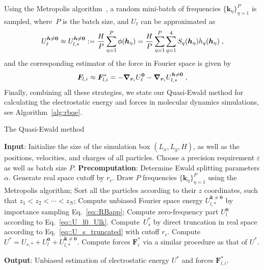 Using the Metropolis algorithm~\cite{metropolis1953equation}, a random mini-batch of frequencies $\{\bm{k}_{\eta}\}_{\eta=1}^P$ is sampled, where~$P$ is the batch size, and $U_\ell$ can be approximated as 
\begin{equation}\label{eq::RBapp}
 U_\ell^{\boldsymbol{h}\neq \bm{0}} \approx U_{l,\ast}^{\boldsymbol{h}\neq \bm{0}}  :=   \frac{H}{P}\sum_{\eta=1}^P \phi(\boldsymbol{h}_{\eta})=  \frac{H}{P}\sum_{\eta=1}^P \sum_{q=1}^4S_q(\boldsymbol{h}_{\eta})h_q(\boldsymbol{h}_{\eta})\;,
\end{equation} 
and the corresponding estimator of the force in Fourier space is given by
\begin{equation}
	 \bm{F}_{l,i}\approx\bm{F}_{l,i}^*=-  \boldsymbol{\nabla}_{\boldsymbol{r}_i} U_\ell^{\bm{0}}- \boldsymbol{\nabla}_{\boldsymbol{r}_i} U_{l,\ast}^{\boldsymbol{h}\neq \bm{0}}\;,
 \end{equation}
Finally, combining all these strategies, we state our Quasi-Ewald method for calculating the electrostatic energy and forces in molecular dynamics simulations, see Algorithm~\ref{alg:rbqe}.
\begin{algorithm}[ht] 
\caption{The Quasi-Ewald method}
\begin{algorithmic}[1]
    \State \textbf{Input}:  Initialize the size of the simulation box $(L_x,L_y, H)$, as well as the positions, velocities, and charges of all particles. Choose a precision requirement $\varepsilon$ as well as batch size $P$.
    \State \textbf{Precomputation}:  Determine Ewald splitting parameters $\alpha$. Generate real space cutoff by $r_c$.
    \Procedure{}       
        \State Draw $P$ frequencies $\{\bm{k}_{\eta}\}_{\eta=1}^{P}$ using the Metropolis algorithm;
        \State Sort all the particles according to their $z$ coordinates, such that $z_1 < z_2 < \cdots < z_N$;
        \State Compute unbiased Fourier space energy $U_{l, *}^{\bm{k}\neq\bm{0}}$ by importance sampling Eq.~\eqref{eq::RBapp};
        \State Compute zero-frequency part $U_{l}^{\bm{0}}$ according to Eq.~\eqref{eq::U_l0_Ulk}.
        \State Compute~$U_{s}^{*}$ by direct truncation in real space according to Eq.~\eqref{eq::U_s_truncated} with cutoff $r_c$. %
        \State Compute $U^{*} = U_{s, *} + U_{l}^{\bm{0}} + U_{l, *}^{\bm{k}\neq\bm{0}}$.
        \State Compute forces $\bm{F}_{i}^{*}$ via a similar procedure as that of $U^{*}$.
    \EndProcedure

    \State \textbf{Output}: Unbiased estimation of electrostatic energy $U^{*}$ and forces $\bm{F}_{l,i}^{*}$.
\end{algorithmic}\label{alg:rbqe}
\end{algorithm}
